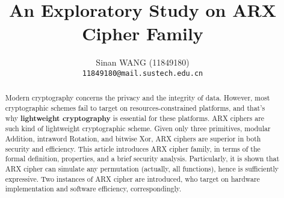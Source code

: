 \documentclass[10pt,twocolumn,letterpaper]{article}
\theoremstyle{definition}
\begin{document}
\title{An Exploratory Study on ARX Cipher Family}

\author{
    Sinan WANG (11849180)\\
    {\tt\small 11849180@mail.sustech.edu.cn}
}

\maketitle

\begin{abstract}
Modern cryptography concerns the privacy and the integrity of data. However, most
cryptographic schemes fail to target on resources-constrained platforms, and that's
why \textbf{lightweight cryptography} is essential for these platforms. ARX ciphers
are such kind of lightweight cryptographic scheme. Given only three primitives,
modular Addition, intraword Rotation, and bitwise Xor, ARX ciphers are superior in
both security and efficiency. This article introduces ARX cipher family, in terms
of the formal definition, properties, and a brief security analysis. Particularly,
it is shown that ARX cipher can simulate any permutation (actually, all functions),
hence is sufficiently expressive. Two instances of ARX cipher are introduced, who
target on hardware implementation and software efficiency, correspondingly.
\end{abstract}













{\small}


\end{document}

